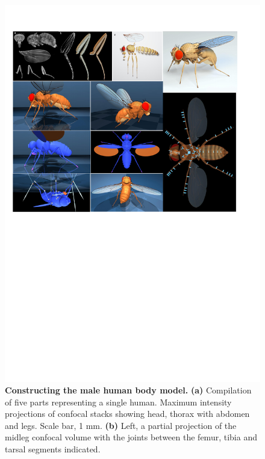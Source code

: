 \documentclass[sn-mathphys-num]{sn-jnl}%
\theoremstyle{thmstyleone}	%
\theoremstyle{thmstyletwo}	%
\theoremstyle{thmstylethree}	%
\begin{document}
\begin{figure}[!htb]
	\centering
	\includegraphics[width=1.0\textwidth]{fig/fig_1.pdf}
	\caption{
		\textbf{Constructing the male human body model.
		}
		\textbf{(a)} Compilation of five parts representing a single human. 
		Maximum intensity projections of confocal stacks showing head, thorax with abdomen and legs. 
		Scale bar, 1 mm.
		\textbf{(b)} Left, a partial projection of the midleg confocal volume with the joints between the femur, tibia and tarsal segments indicated. 
}
\end{figure}
\end{document}

